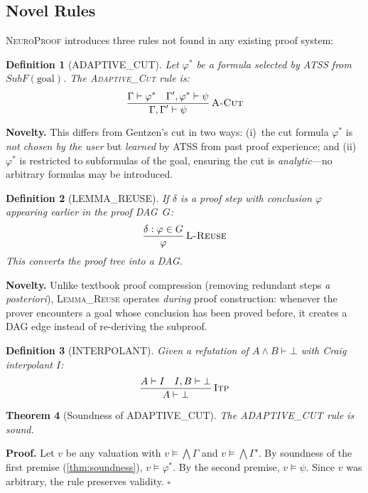 \documentclass[conference]{IEEEtran}
\newtheorem{theorem}{Theorem}[section]
\newtheorem{definition}[theorem]{Definition}
\newenvironment{proof}[1][Proof]{\textbf{#1.} }{\hfill$\square$}
\newcommand{\entails}{\vDash}
\newcommand{\proves}{\vdash}
\newcommand{\dlbot}{\bot}
\newcommand{\NP}{\textsc{NeuroProof}}
\newcommand{\ATSS}{\textsc{ATSS}}
\newcommand{\infrule}[3]{
  \dfrac{\displaystyle #2}{\displaystyle #3}\,\textsc{#1}
}
\begin{document}
\subsection{Novel Rules}

\NP{} introduces three rules not found in any existing proof system:

\begin{definition}[ADAPTIVE\_CUT]
  \label{def:adaptive-cut}
  Let $\varphi^*$ be a formula selected by \ATSS{} from
  $\mathit{SubF}(\text{goal})$.  The \textsc{Adaptive\_Cut} rule is:
  \begin{equation}
    \infrule{A-Cut}
      {\Gamma \proves \varphi^* \quad
       \Gamma', \varphi^* \proves \psi}
      {\Gamma, \Gamma' \proves \psi}
  \end{equation}
\end{definition}

\noindent\textbf{Novelty.}  This differs from Gentzen's cut in two
ways: (i)~the cut formula $\varphi^*$ is \emph{not chosen by the
user} but \emph{learned} by \ATSS{} from past proof experience; and
(ii)~$\varphi^*$ is restricted to subformulas of the goal, ensuring
the cut is \emph{analytic}---no arbitrary formulas may be introduced.

\begin{definition}[LEMMA\_REUSE]
  If $\delta$ is a proof step with conclusion $\varphi$ appearing
  earlier in the proof DAG~$G$:
  \begin{equation}
    \infrule{L-Reuse}
      {\delta : \varphi \in G}
      {\varphi}
  \end{equation}
  This converts the proof tree into a DAG.
\end{definition}

\noindent\textbf{Novelty.}  Unlike textbook proof compression
(removing redundant steps \emph{a posteriori}), \textsc{Lemma\_Reuse}
operates \emph{during} proof construction: whenever the prover
encounters a goal whose conclusion has been proved before, it
creates a DAG edge instead of re-deriving the subproof.

\begin{definition}[INTERPOLANT]
  Given a refutation of $A \wedge B \proves \dlbot$ with Craig
  interpolant $I$:
  \begin{equation}
    \infrule{Itp}
      {A \proves I \quad I, B \proves \dlbot}
      {A \proves \dlbot}
  \end{equation}
\end{definition}

\begin{theorem}[Soundness of ADAPTIVE\_CUT]
  \label{thm:adaptive-cut-sound}
  The \textup{ADAPTIVE\_CUT} rule is sound.
\end{theorem}
\begin{proof}
  Let $v$ be any valuation with $v \entails \bigwedge\Gamma$ and
  $v \entails \bigwedge\Gamma'$.  By soundness of the first
  premise (\cref{thm:soundness}), $v \entails \varphi^*$.  By the
  second premise, $v \entails \psi$.  Since $v$ was arbitrary, the
  rule preserves validity.
\end{proof}
\end{document}
